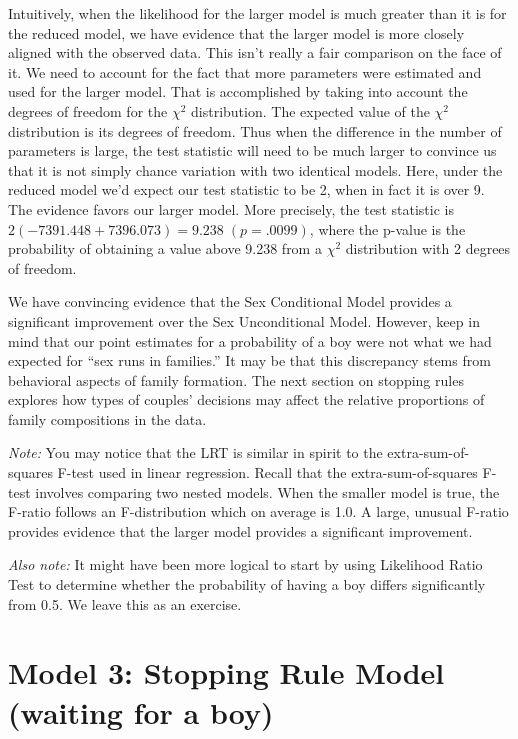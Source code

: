 \documentclass[
]{krantz}
\begin{document}
Intuitively, when the likelihood for the larger model is much greater than it is for the reduced model, we have evidence that the larger model is more closely aligned with the observed data. This isn't really a fair comparison on the face of it. We need to account for the fact that more parameters were estimated and used for the larger model. That is accomplished by taking into account the degrees of freedom for the \(\chi^2\) distribution. The expected value of the \(\chi^2\) distribution is its degrees of freedom. Thus when the difference in the number of parameters is large, the test statistic will need to be much larger to convince us that it is not simply chance variation with two identical models. Here, under the reduced model we'd expect our test statistic to be 2, when in fact it is over 9. The evidence favors our larger model. More precisely, the test statistic is \(2(-7391.448+7396.073) = 9.238\; (p=.0099)\), where the p-value is the probability of obtaining a value above 9.238 from a \(\chi^2\) distribution with 2 degrees of freedom.

We have convincing evidence that the Sex Conditional Model provides a significant improvement over the Sex Unconditional Model. However, keep in mind that our point estimates for a probability of a boy were not what we had expected for ``sex runs in families.'' It may be that this discrepancy stems from behavioral aspects of family formation. The next section on stopping rules explores how types of couples' decisions may affect the relative proportions of family compositions in the data.

\emph{Note: }You may notice that the LRT is similar in spirit to the extra-sum-of-squares F-test used in linear regression. Recall that the extra-sum-of-squares F-test involves comparing two nested models. When the smaller model is true, the F-ratio follows an F-distribution which on average is 1.0. A large, unusual F-ratio provides evidence that the larger model provides a significant improvement.

\emph{Also note: } It might have been more logical to start by using Likelihood Ratio Test to determine whether the probability of having a boy differs significantly from 0.5. We leave this as an exercise.

\hypertarget{model-3-stopping-rule-model-waiting-for-a-boy}{%
\section{Model 3: Stopping Rule Model (waiting for a boy)}\label{model-3-stopping-rule-model-waiting-for-a-boy}}
\end{document}
